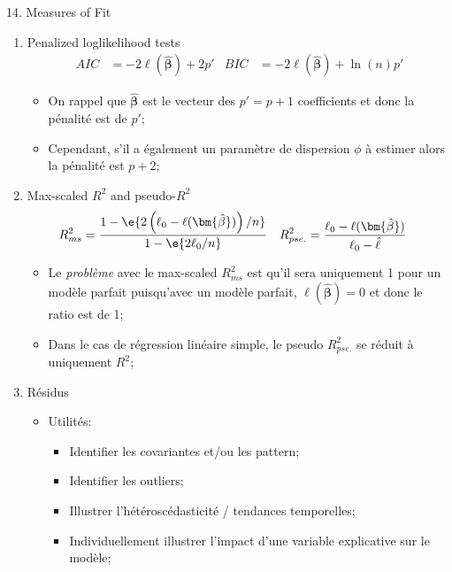 \documentclass[12pt, titlepage, french]{report}
\begin{document}
\begin{CHPT_SUMM}{14. Measures of Fit}
\begin{enumerate}
\begin{itemize}
\begin{itemize}
			\item	Pareillement, lorsqu'on récrit le TRV avec la déviance on retourne à la notation réduit vs complet (avec vs sans contraintes);
			\item	Finalement, on note que la log-vraisemblance du modèle complet (saturé) devrait être supérieure à celle du modèle réduite;
		\end{itemize}
	\end{itemize}
	\item	Penalized loglikelihood tests
	\begin{align*}
		AIC &= -2 \ell(\bm{\hat{\beta}}) + 2 p'	&
		BIC &= -2 \ell(\bm{\hat{\beta}}) + \ln (n) p'
	\end{align*}
	\begin{itemize}
		\item	On rappel que $\bm{\hat{\beta}}$ est le vecteur des $p' = p + 1$ coefficients et donc la pénalité est de $p'$;
		\item	Cependant, s'il a également un paramètre de dispersion $\phi$ à estimer alors la pénalité est $p + 2$;
	\end{itemize}
	\item	Max-scaled $R^{2}$ and pseudo-$R^{2}$
	\begin{align*}
		R^{2}_{ms}	&=	\frac{1 - \e{2\left(\ell_{0} - \ell(\bm{\hat{\beta}})\right)/n}}{1 - \e{2 \ell_{0}/n}}	&
		R^{2}_{pse.}	&=	\frac{\ell_{0} - \ell(\bm{\hat{\beta}})}{\ell_{0} - \hat{\ell}}
	\end{align*}
	\begin{itemize}
		\item	Le \og \textit{problème} \fg{} avec le max-scaled $R^{2}_{ms}$ est qu'il sera uniquement 1 pour un modèle parfait puisqu'avec un modèle parfait, $\ell(\bm{\hat{\beta}}) = 0$ et donc le ratio est de 1;
		\item	Dans le cas de régression linéaire simple, le pseudo $R^{2}_{pse.}$ se réduit à uniquement $R^{2}$;
	\end{itemize}
	\item	Résidus
	\begin{itemize}
		\item	Utilités:
		\begin{itemize}
			\item	Identifier les covariantes et/ou les pattern;
			\item	Identifier les outliers;
			\item	Illustrer l'hétéroscédasticité / tendances temporelles;
			\item	Individuellement illustrer l'impact d'une variable explicative sur le modèle;

\end{itemize}
\end{itemize}
\end{enumerate}
\end{CHPT_SUMM}
\end{document}
